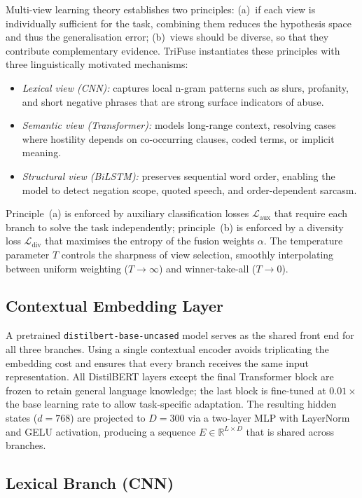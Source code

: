 \documentclass[10pt,twocolumn,a4paper]{article}
\begin{document}
Multi-view learning theory \citep{ref19} establishes two principles: (a)~if each view is individually sufficient for the task, combining them reduces the hypothesis space and thus the generalisation error; (b)~views should be diverse, so that they contribute complementary evidence. TriFuse instantiates these principles with three linguistically motivated mechanisms:
\begin{itemize}
\item \emph{Lexical view (CNN):} captures local n-gram patterns such as slurs, profanity, and short negative phrases that are strong surface indicators of abuse.
\item \emph{Semantic view (Transformer):} models long-range context, resolving cases where hostility depends on co-occurring clauses, coded terms, or implicit meaning.
\item \emph{Structural view (BiLSTM):} preserves sequential word order, enabling the model to detect negation scope, quoted speech, and order-dependent sarcasm.
\end{itemize}
Principle~(a) is enforced by auxiliary classification losses $\mathcal{L}_{\mathrm{aux}}$ that require each branch to solve the task independently; principle~(b) is enforced by a diversity loss $\mathcal{L}_{\mathrm{div}}$ that maximises the entropy of the fusion weights $\alpha$. The temperature parameter $T$ controls the sharpness of view selection, smoothly interpolating between uniform weighting ($T \to \infty$) and winner-take-all ($T \to 0$).

\subsection{Contextual Embedding Layer}\label{subsec:embedding}

A pretrained \texttt{distilbert-base-uncased} model serves as the shared front end for all three branches. Using a single contextual encoder avoids triplicating the embedding cost and ensures that every branch receives the same input representation. All DistilBERT layers except the final Transformer block are frozen to retain general language knowledge; the last block is fine-tuned at $0.01\times$ the base learning rate to allow task-specific adaptation. The resulting hidden states ($d{=}768$) are projected to $D{=}300$ via a two-layer MLP with LayerNorm and GELU activation, producing a sequence $E \in \mathbb{R}^{L \times D}$ that is shared across branches.

\subsection{Lexical Branch (CNN)}\label{subsec:cnn}
\end{document}
